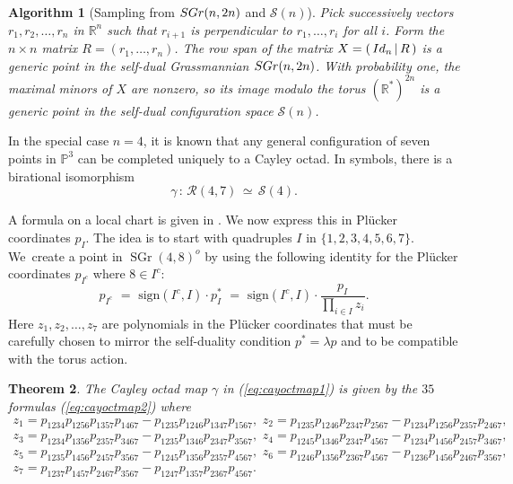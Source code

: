 \documentclass[12pt]{extarticle}
\newtheorem{theorem}{Theorem}
\newtheorem{algo}[theorem]{Algorithm}
\theoremstyle{definition}
\numberwithin{theorem}{section}
\theoremstyle{plain}\newtheorem{ithm}{Theorem}
\newcommand{\PP}{\mathbb{P}}
\newcommand{\RR}{\mathbb{R}}
\DeclareMathOperator{\SGr}{SGr}
\begin{document}
\color{black}

\begin{algo}[Sampling from ${\rm SGr}(n,2n)$ and $\mathcal{S}(n)$] \label{alg:SOn}
Pick successively  vectors
$r_1,r_2,\ldots,r_n $ in $\mathbb{R}^n$  such that
$r_{i+1}$ is perpendicular to $r_1,\ldots,r_i$ for all $i$.
Form the $n \times n$ matrix $R = (r_1,\ldots,r_n)$.
The row span of the matrix $X = (\,{\rm Id}_n \,|\, R\,)$ is
a generic point in the self-dual Grassmannian  ${\rm SGr}(n,2n)$. With probability one, the maximal minors of $X$ are nonzero, so its image modulo
the torus $(\RR^*)^{2n}$ is a generic point in the self-dual configuration space $\mathcal{S}(n)$.
\end{algo}

In the special case $n=4$, it is known that
any general configuration of seven points in $\PP^3$
can be completed uniquely to a 
Cayley octad. 
In symbols,
there is a birational isomorphism
\begin{equation}
\label{eq:cayoctmap1}
\gamma \, : \, \mathcal{R}(4,7) \,\simeq \, \mathcal{S}(4).
\end{equation}

A formula on a local chart is given in \cite[Proposition 7.1]{PSV}.
We now express this in  Pl\"ucker coordinates $p_I$.
The idea is to start with 
quadruples $I$ in $\{1,2,3,4,5,6,7\}$. We~create a point in $\SGr(4,8)^o$ by using the following identity for the Pl\"ucker coordinates $p_{I^c}$ where $8\in I^c$:
\begin{equation}
\label{eq:cayoctmap2}
p_{I^c} \,\,=\,\, \text{sign}(I^c,I)\cdot p_I^*  \,\,=\,\, \text{sign}(I^c,I)\cdot \frac{p_I}{\prod_{i \in I} z_i }. 
\end{equation}
Here $z_1,z_2,\ldots,z_7$ are polynomials in the Pl\"ucker coordinates that must be carefully chosen to mirror the self-duality condition $p^* =\lambda p$ and to be compatible with the torus action.

\begin{theorem} \label{thm:gamma}
The Cayley octad map $\gamma$ in (\ref{eq:cayoctmap1}) is given by the
$35$ formulas (\ref{eq:cayoctmap2}) where
$$ \begin{matrix} z_1 =  p_{1234} p_{1256} p_{1357} p_{1467} - p_{1235} p_{1246} p_{1347} p_{1567}, \,\,
z_2 =  p_{1235} p_{1246} p_{2347} p_{2567} - p_{1234} p_{1256} p_{2357} p_{2467}, \\
z_3 =  p_{1234} p_{1356} p_{2357} p_{3467} - p_{1235} p_{1346} p_{2347} p_{3567}, \,\,
z_4 =  p_{1245} p_{1346} p_{2347} p_{4567} - p_{1234} p_{1456} p_{2457} p_{3467}, \\
z_5 =  p_{1235} p_{1456} p_{2457} p_{3567} - p_{1245} p_{1356} p_{2357} p_{4567}, \,\,
z_6 =  p_{1246} p_{1356} p_{2367} p_{4567} - p_{1236} p_{1456} p_{2467} p_{3567}, \\
z_7 = p_{1237} p_{1457} p_{2467} p_{3567} - p_{1247} p_{1357} p_{2367} p_{4567}.
 \end{matrix}
 $$
\end{theorem}
\end{document}
